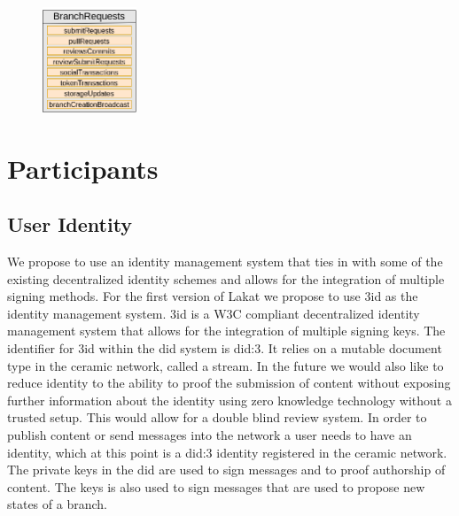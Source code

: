 \documentclass[14pt]{article}
\newcommand{\remark}[1]{{\color{purple} (#1)}}
\begin{document}



\begin{figure}[h!]
  \begin{center}
    \includegraphics[width=0.25\textwidth]{src/img/MempoolV3.png}
\end{center}
 \caption{}
 \label{fig:mempool}
\end{figure}



\section{Participants}
\label{sc:participantsandnodes}

\subsection{User Identity}
\label{ssc:accounts}

We propose to use an identity management system that ties in with some of the existing decentralized identity schemes and allows for the integration of multiple signing methods. For the first version of Lakat we propose to use 3id as the identity management system. 3id is a W3C compliant decentralized identity management system that allows for the integration of multiple signing keys. The identifier for 3id within the did system is did:3. It relies on a mutable document type in the ceramic network, called a stream. In the future we would also like to reduce identity to the ability to proof the submission of content without exposing further information about the identity using zero knowledge technology without a trusted setup. This would allow for a double blind review system. In order to publish content or send messages into the network a user needs to have an identity, which at this point is a did:3 identity registered in the ceramic network. The private keys in the did are used to sign messages and to proof authorship of content. The keys is also used to sign messages that are used to propose new states of a branch.
\end{document}
